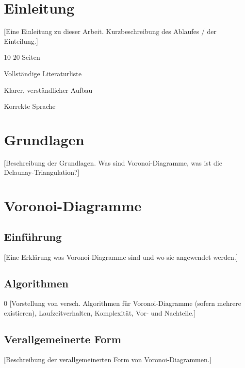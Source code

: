 \documentclass[pdftex,12pt,a4paper]{article}
\begin{document}


\newpage

\section{Einleitung}

[Eine Einleitung zu dieser Arbeit. Kurzbeschreibung des Ablaufes / der Einteilung.]\\

\noindent [TODO:]
\begin{compactitem}
	\item 10-20 Seiten
	\item Vollständige Literaturliste
	\item Klarer, verständlicher Aufbau
	\item Korrekte Sprache
\end{compactitem}

\newpage

\section{Grundlagen}

[Beschreibung der Grundlagen. Was sind Voronoi-Diagramme, was ist die Delaunay-Triangulation?]

\newpage

\section{Voronoi-Diagramme}

\subsection{Einführung}
[Eine Erklärung was Voronoi-Diagramme sind und wo sie angewendet werden.]

\subsection{Algorithmen}0
[Vorstellung von versch. Algorithmen für Voronoi-Diagramme (sofern mehrere existieren), Laufzeitverhalten, Komplexität, Vor- und Nachteile.]

\subsection{Verallgemeinerte Form}
[Beschreibung der verallgemeinerten Form von Voronoi-Diagrammen.]
\end{document}
